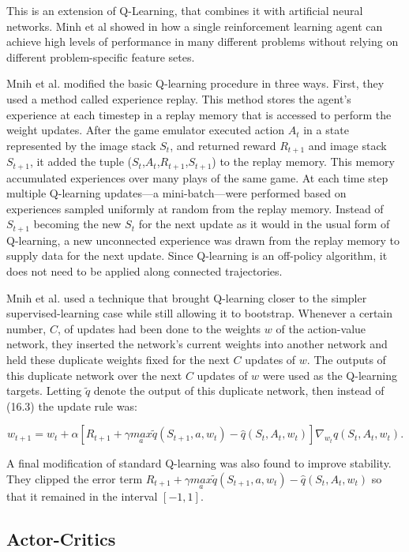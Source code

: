 \documentclass[letterpaper, 10 pt]{IEEEconf}
\begin{document}
This is an extension of Q-Learning, that combines it with artificial neural networks. Minh et al showed in \cite{minh_dqn} how a single reinforcement learning agent can achieve high levels of performance in many different problems without relying on different problem-specific feature setes.

Mnih et al. modified the basic Q-learning procedure in three ways. First, they used a method called experience replay. This method stores the agent’s experience at each timestep in a replay memory that is accessed to perform the weight updates. After the game emulator executed action $A_t$ in a state represented by the image stack $S_t$, and returned reward $R_{t+1}$ and image stack $S_{t+1}$, it added the tuple ($S_t$,$A_t$,$R_{t+1}$,$S_{t+1}$) to the replay memory. This memory accumulated experiences over many plays of the same game. At each time step multiple Q-learning updates—a mini-batch—were performed based on experiences sampled uniformly at random from the replay memory. Instead of $S_{t+1}$ becoming the new $S_t$ for the next update as it would in the usual form of Q-learning, a new unconnected experience was drawn from the replay memory to supply data for the next update. Since Q-learning is an off-policy algorithm, it does not need to be applied along connected trajectories.

Mnih et al. used a technique that brought Q-learning closer to the simpler supervised-learning case while still allowing it to bootstrap. Whenever a certain number, $C$, of updates had been done to the weights $w$ of the action-value network, they inserted the network’s current weights into another network and held these duplicate weights fixed for the next $C$ updates of $w$. The outputs of this duplicate network over the next $C$ updates of $w$ were used as the Q-learning targets. Letting $\tilde{q}$ denote the output of this duplicate network, then instead of (16.3) the update rule was:

$$
w_{t+1}=w_t+\alpha[R_{t+1}+\gamma \underset{a}{max} \tilde{q}(S_{t+1},a,w_t)-\hat{q}(S_t,A_t,w_t)]\nabla_{w_t}\hat{q}(S_t,A_t,w_t).
$$

A final modification of standard Q-learning was also found to improve stability. They clipped the error term $R_{t+1}+\gamma \underset{a}{max} \tilde{q}\left(S_{t+1},a,w_t\right)-\hat{q}\left(S_t,A_t,w_t\right)$ so that it remained in the interval $\left[-1,1\right]$.

\subsection{Actor-Critics}
\end{document}
